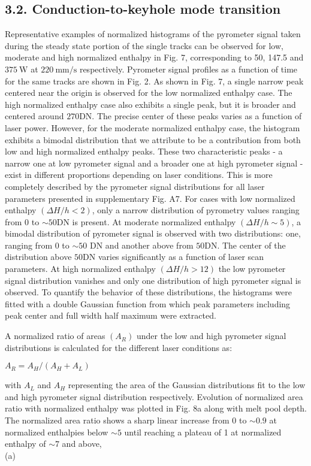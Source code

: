 \documentclass[10pt]{article}
\begin{document}
\subsection*{3.2. Conduction-to-keyhole mode transition}
Representative examples of normalized histograms of the pyrometer signal taken during the steady state portion of the single tracks can be observed for low, moderate and high normalized enthalpy in Fig. 7, corresponding to 50, 147.5 and $375 \mathrm{~W}$ at $220 \mathrm{~mm} / \mathrm{s}$ respectively. Pyrometer signal profiles as a function of time for the same tracks are shown in Fig. 2. As shown in Fig. 7, a single narrow peak centered near the origin is observed for the low normalized enthalpy case. The high normalized enthalpy case also exhibits a single peak, but it is broader and centered around $270 \mathrm{DN}$. The precise center of these peaks varies as a function of laser power. However, for the moderate normalized enthalpy case, the histogram exhibits a bimodal distribution that we attribute to be a contribution from both low and high normalized enthalpy peaks. These two characteristic peaks - a narrow one at low pyrometer signal and a broader one at high pyrometer signal - exist in different proportions depending on laser conditions. This is more completely described by the pyrometer signal distributions for all laser parameters presented in supplementary Fig. A7. For cases with low normalized enthalpy $(\Delta H / h<2)$, only a narrow distribution of pyrometry values ranging from 0 to $\sim 50 \mathrm{DN}$ is present. At moderate normalized enthalpy $(\Delta H / h \sim 5)$, a bimodal distribution of pyrometer signal is observed with two distributions: one, ranging from 0 to $\sim 50$ $\mathrm{DN}$ and another above from $50 \mathrm{DN}$. The center of the distribution above $50 \mathrm{DN}$ varies significantly as a function of laser scan parameters. At high normalized enthalpy $(\Delta H / h>12)$ the low pyrometer signal distribution vanishes and only one distribution of high pyrometer signal is observed. To quantify the behavior of these distributions, the histograms were fitted with a double Gaussian function from which peak parameters including peak center and full width half maximum were extracted.

A normalized ratio of areas $\left(A_{R}\right)$ under the low and high pyrometer signal distributions is calculated for the different laser conditions as:

$A_{R}=A_{H} /\left(A_{H}+A_{L}\right)$

with $A_{L}$ and $A_{H}$ representing the area of the Gaussian distributions fit to the low and high pyrometer signal distribution respectively. Evolution of normalized area ratio with normalized enthalpy was plotted in Fig. 8a along with melt pool depth. The normalized area ratio shows a sharp linear increase from 0 to $\sim 0.9$ at normalized enthalpies below $\sim 5$ until reaching a plateau of 1 at normalized enthalpy of $\sim 7$ and above,\\
(a)
\end{document}
